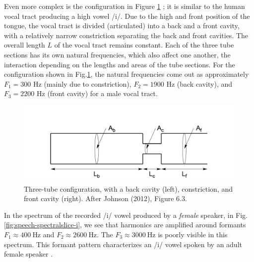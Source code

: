 \documentclass[
]{book}
\begin{document}
Even more complex is the configuration in Figure \ref{fig:threetube} \citep[after][Fig.3.15, p.144]{Stevens_1998}; it is similar to the human vocal tract producing a high vowel /i/. Due to the high and front position of the tongue, the vocal tract is divided (articulated) into a back and a front cavity, with a relatively narrow constriction separating the back and front cavities. The overall length \(L\) of the vocal tract remains constant. Each of the three tube sections has its own natural frequencies, which also affect one another, the interaction depending on the lengths and areas of the tube sections. For the configuration shown in Fig.\ref{fig:threetube}, the natural frequencies come out as approximately \(F_1=300\) Hz (mainly due to constriction), \(F_2=1900\) Hz (back cavity), and \(F_3=2200\) Hz (front cavity) \citep[137]{Johnson_2012} for a male vocal tract.

\begin{figure}

{\centering \includegraphics{figures/threetube} 

}

\caption{Three-tube configuration, with a back cavity (left), constriction, and front cavity (right). After Johnson (2012), Figure 6.3.}\label{fig:threetube}
\end{figure}

In the spectrum of the recorded /i/ vowel produced by a \emph{female} speaker, in Fig.\ref{fig:speech-spectralslice-i}, we see that harmonics are amplified around formants \(F_1 \approx 400\ \textrm{Hz}\) and \(F_2 \approx 2600\ \textrm{Hz}\). The \(F_3 \approx 3000\ \textrm{Hz}\) is poorly visible in this spectrum. This formant pattern characterizes an /i/ vowel spoken by an adult female speaker \citep[Table II]{Peterson_Barney_1952}.
\end{document}
